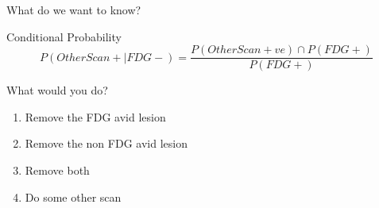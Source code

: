 \begin{frame}{What do we want to know?  }
\begin{block}{Conditional Probability}
  \begin{equation}
  		P(OtherScan+ | FDG -) = \dfrac{P(OtherScan+ve) \cap  P(FDG+)}{P(FDG+)}
  \end{equation}
\end{block}
\end{frame} 
\begin{frame}{What would you do?  }
	\begin{enumerate}
         \item Remove the FDG avid lesion
         \item Remove the non FDG avid lesion
         \item Remove both
         \item Do some other scan
	\end{enumerate}
\end{frame} 


